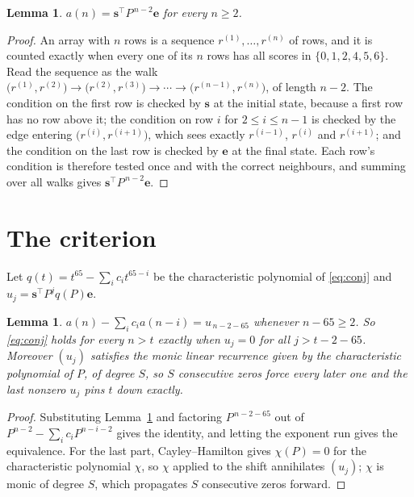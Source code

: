 \documentclass[11pt,a4paper]{article}
\theoremstyle{plain}
\newtheorem{lemma}[theorem]{Lemma}
\theoremstyle{definition}
\begin{document}
\begin{lemma}\label{lem:walk}
$a(n)=\mathbf{s}^{\!\top}P^{\,n-2}\mathbf{e}$ for every $n\ge2$.
\end{lemma}

\begin{proof}
An array with $n$ rows is a sequence $r^{(1)},\dots,r^{(n)}$ of rows, and it is counted
exactly when every one of its $n$ rows has all scores in $\{0,1,2,4,5,6\}$. Read the sequence as the
walk $\bigl(r^{(1)},r^{(2)}\bigr)\to\bigl(r^{(2)},r^{(3)}\bigr)\to\cdots\to
\bigl(r^{(n-1)},r^{(n)}\bigr)$, of length $n-2$. The condition on the first row is
checked by $\mathbf{s}$ at the initial state, because a first row has no row above it; the
condition on row $i$ for $2\le i\le n-1$ is checked by the edge entering
$\bigl(r^{(i)},r^{(i+1)}\bigr)$, which sees exactly $r^{(i-1)}$, $r^{(i)}$ and
$r^{(i+1)}$; and the condition on the last row is checked by $\mathbf{e}$ at the final
state. Each row's condition is therefore tested once and with the correct neighbours, and
summing over all walks gives $\mathbf{s}^{\!\top}P^{\,n-2}\mathbf{e}$.
\end{proof}

\section{The criterion}

Let $q(t)=t^{65}-\sum_i c_i t^{65-i}$ be the characteristic polynomial of
\eqref{eq:conj} and $u_j=\mathbf{s}^{\!\top}P^{j}q(P)\mathbf{e}$.

\begin{lemma}\label{lem:crit}
$a(n)-\sum_i c_i a(n-i)=u_{\,n-2-65}$ whenever $n-65\ge2$. So \eqref{eq:conj}
holds for every $n>t$ exactly when $u_j=0$ for all $j>t-2-65$. Moreover $(u_j)$
satisfies the monic linear recurrence given by the characteristic polynomial of $P$, of
degree $S$, so $S$ consecutive zeros force every later one and the last nonzero $u_j$ pins
$t$ down exactly.
\end{lemma}

\begin{proof}
Substituting Lemma~\ref{lem:walk} and factoring $P^{\,n-2-65}$ out of
$P^{n-2}-\sum_i c_i P^{n-i-2}$ gives the identity, and letting the exponent run gives the
equivalence. For the last part, Cayley--Hamilton gives $\chi(P)=0$ for the characteristic
polynomial $\chi$, so $\chi$ applied to the shift annihilates $(u_j)$; $\chi$ is monic of
degree $S$, which propagates $S$ consecutive zeros forward.
\end{proof}
\end{document}
